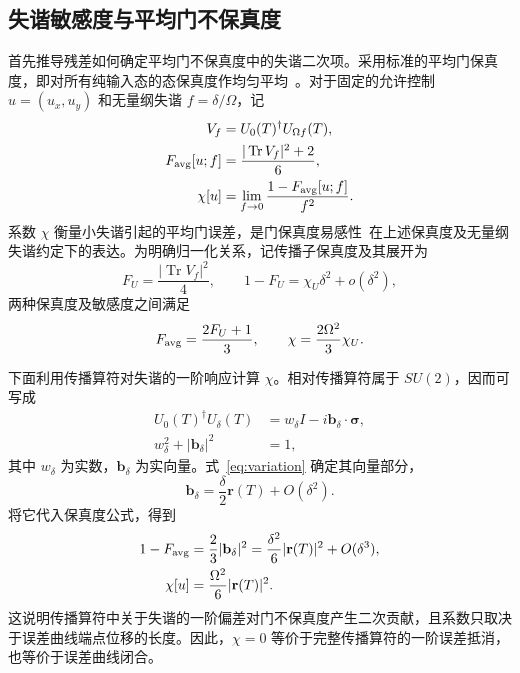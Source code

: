 \documentclass[12pt]{iopjournal}
\theoremstyle{definition}
\newcommand{\rvec}{\mathbf r}
\newcommand{\sigmavec}{\boldsymbol\sigma}
\begin{document}
\FloatBarrier
\subsection{失谐敏感度与平均门不保真度}

首先推导残差如何确定平均门不保真度中的失谐二次项。采用标准的平均门保真度，即对所有纯输入态的态保真度作均匀平均~\cite{bowdrey2002,nielsen2002}。对于固定的允许控制 $u=(u_x,u_y)$ 和无量纲失谐 $f=\delta/\Omega$，记
\begin{equation}
 \begin{aligned}
 V_f&=U_0(T)^\dagger U_{\Omega f}(T),\\
 F_{\rm avg}[u;f]&=\frac{|\operatorname{Tr}V_f|^2+2}{6},\\
 \chi[u]&=\lim_{f\to0}\frac{1-F_{\rm avg}[u;f]}{f^2}.
 \end{aligned}
 \label{eq:sensitivity}
\end{equation}
系数 $\chi$ 衡量小失谐引起的平均门误差，是门保真度易感性~\cite{poggi2024}在上述保真度及无量纲失谐约定下的表达。为明确归一化关系，记传播子保真度及其展开为
\begin{equation*}
 F_U=\frac{|\operatorname{Tr}V_f|^2}{4},\qquad
 1-F_U=\chi_U\delta^2+o(\delta^2),
\end{equation*}
两种保真度及敏感度之间满足
\begin{equation*}
 F_{\rm avg}=\frac{2F_U+1}{3},\qquad
 \chi=\frac{2\Omega^2}{3}\chi_U.
\end{equation*}

下面利用传播算符对失谐的一阶响应计算 $\chi$。相对传播算符属于 $SU(2)$，因而可写成
\begin{equation*}
 \begin{aligned}
 U_0(T)^\dagger U_\delta(T)
   &=w_\delta I-i\mathbf b_\delta\cdot\sigmavec,\\
 w_\delta^2+|\mathbf b_\delta|^2&=1,
 \end{aligned}
\end{equation*}
其中 $w_\delta$ 为实数，$\mathbf b_\delta$ 为实向量。式~\eqref{eq:variation} 确定其向量部分，
\begin{equation*}
 \mathbf b_\delta=\frac{\delta}{2}\rvec(T)+O(\delta^2).
\end{equation*}
将它代入保真度公式，得到
\begin{equation}
 \begin{aligned}
 1-F_{\rm avg}&=\frac23|\mathbf b_\delta|^2
 =\frac{\delta^2}{6}|\rvec(T)|^2+O(\delta^3),\\
 \chi[u]&=\frac{\Omega^2}{6}|\rvec(T)|^2.
 \end{aligned}
 \label{eq:chi-curve}
\end{equation}
这说明传播算符中关于失谐的一阶偏差对门不保真度产生二次贡献，且系数只取决于误差曲线端点位移的长度。因此，$\chi=0$ 等价于完整传播算符的一阶误差抵消，也等价于误差曲线闭合。
\end{document}
